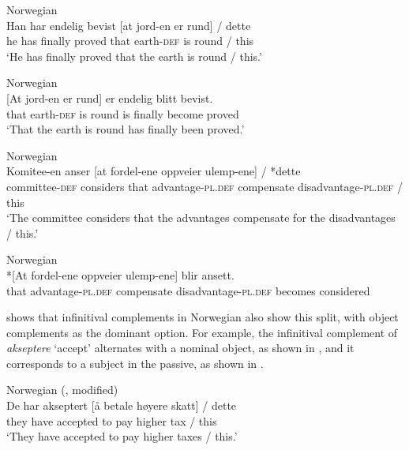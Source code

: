 \documentclass[output=paper,hidelinks]{langscibook}
\begin{document}
\ea\label{ex:Scandinavian:42} Norwegian \citep[65]{Lodrup04}\\
\gll
 {Han} {har} {endelig} {bevist} {[at} {jord-en} {er} {rund]} {/} {dette}\\
 he has finally proved \phantom{[}that earth\textsc{{}-def} is round / this\\
\glt `He has finally proved that the earth is round / this.'
\z


\ea\label{ex:Scandinavian:43} Norwegian \citep[65]{Lodrup04}\\
\gll
 {[At} {jord-en} {er} {rund]} {er} {endelig} {blitt} {bevist.}\\
 \phantom{[}that earth\textsc{{}-def} is round is finally become proved\\
\glt `That the earth is round has finally been proved.'\z



\ea\label{ex:Scandinavian:44} Norwegian\\
\gll
 {Komitee-en} {anser} {[at} {fordel-ene} {oppveier} {ulemp-ene]} {/} {*dette} \\
 committee\textsc{{}-def} considers \phantom{[}that advantage\textsc{{}-pl.def} compensate disadvantage\textsc{{}-pl.def} / this\\
\glt `The committee considers that the advantages compensate for the disadvantages / this.'\z



\ea\label{ex:Scandinavian:45} Norwegian\\
\gll
 {*[At} {fordel-ene} {oppveier} {ulemp-ene]} {blir} {ansett.}\\
 \phantom{*[}that advantage\textsc{{}-pl.def} compensate disadvantage\textsc{{}-pl.def} becomes considered\\
 \glt
 \z

\noindent \citet{Lodrup04} shows that infinitival complements in Norwegian also show this split, with object complements as the dominant option. For example, the infinitival complement of \textit{akseptere} `accept' alternates with a nominal object, as shown in , and it corresponds to a subject in the passive, as shown in .



\ea\label{ex:Scandinavian:46} Norwegian (\citealt[70]{Lodrup04}, modified)\\
\gll
 {De} {har} {akseptert} {[å} {betale} {høyere} {skatt]} {/} {dette} \\
 they have accepted \phantom{[}to pay higher tax / this\\
\glt `They have accepted to pay higher taxes / this.'\z
\end{document}
